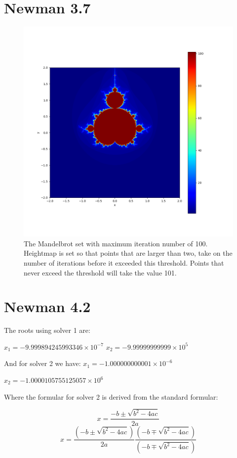 \documentclass[11pt]{article}
\begin{document}
\section{Newman 3.7}
\begin{figure}[h!]
    \centering
    \includegraphics[width=1.0\textwidth]{fractal.png}
    \caption{The Mandelbrot set with maximum iteration number of 100. Heightmap is set so that points that are larger than two, take on the number of iterations before it exceeded this threshold. Points that never exceed the threshold will take the value 101. }
    \label{fig:your_label}
\end{figure}

\section{Newman 4.2}
The roots using solver 1 are: 

$x_1=-9.999894245993346 \times 10^{-7}$
$x_2=-9.99999999999 \times 10^{5}$

And for solver 2 we have: 
$x_1=-1.000000000001 \times 10^{-6}$

$x_2=-1.0000105755125057\times10^{6}$

Where the formular for solver 2 is derived from the standard formular:

$$x=\frac{-b \pm \sqrt{b^2-4ac}}{2a}$$
$$x=\frac{(-b \pm \sqrt{b^2-4ac})}{2a}\frac{(-b\mp\sqrt{b^2-4ac})}{(-b\mp\sqrt{b^2-4ac})}$$
\end{document}
